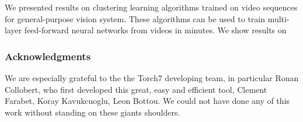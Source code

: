 \documentclass{article} %
\begin{document}
We presented results on clustering learning algorithms trained on video sequences for general-purpose vision system. These algorithms can be used to train multi-layer feed-forward neural networks from videos in minutes. We show results on 



%


\subsubsection*{Acknowledgments}
We are especially grateful to the the Torch7 developing team, in particular Ronan Collobert, who first developed this great, easy and efficient tool, Clement Farabet, Koray Kavukcuoglu, Leon Bottou. We could not have done any of this work without standing on these giants shoulders.



\end{document}
